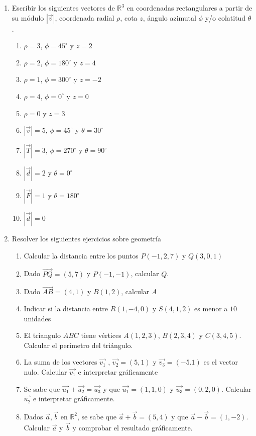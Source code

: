 \documentclass[a4paper]{article}
\newcommand{\exercise}{\item}
\newcommand{\vect}[1]{\overrightarrow{#1}}
\newcommand{\degs}{^{\circ}}
\begin{document}
\begin{enumerate}
\begin{multicols}{2}
\begin{enumerate} [label=(\alph*)]
	\end{enumerate}
	\end{multicols}
	\exercise Escribir los siguientes vectores de $\mathbb{R}^3$ en coordenadas rectangulares a partir de su módulo $|\vec{v}|$, coordenada radial $\rho$, cota $z$, ángulo azimutal $\phi$ y/o colatitud $\theta$.
	\begin{multicols}{2}
	\begin{enumerate} [label=(\alph*)]
		\item $\rho=3$, $\phi=45\degs$ y $z=2$
		\item $\rho=2$, $\phi=180\degs$ y $z=4$
		\item $\rho=1$, $\phi=300\degs$ y $z=-2$
		\item $\rho=4$, $\phi=0\degs$ y $z=0$
		\item $\rho=0$ y $z=3$
		\item $\left|\vec{v}\right|=5$, $\phi=45\degs$ y $\theta=30\degs$
		\item $\left|\vec{T}\right|=3$, $\phi=270\degs$ y $\theta=90\degs$
		\item $\left|\vec{d}\right|=2$ y $\theta=0\degs$
		\item $\left|\vec{F}\right|=1$ y $\theta=180\degs$
		\item $\left|\vec{d}\right|=0$
	\end{enumerate}
	\end{multicols}
	\exercise Resolver los siguientes ejercicios sobre geometría
	\begin{enumerate} [label=(\alph*)]
		\item Calcular la distancia entre los puntos $P(-1,2,7)$ y $Q(3,0,1)$
		\item Dado $\vect{PQ}=(5,7)$ y $P(-1,-1)$, calcular $Q$.
		\item Dado $\vect{AB}=(4,1)$ y $B(1,2)$, calcular $A$
		\item Indicar si la distancia entre $R(1,-4,0)$ y $S(4,1,2)$ es menor a $10$ unidades
		\item El triangulo $ABC$ tiene vértices $A(1,2,3)$, $B(2,3,4)$ y $C(3,4,5)$. Calcular el perímetro del triángulo.
		\item La suma de los vectores $\vect{v_1}$ , $\vect{v_2}=(5,1)$ y $\vect{v_3} = (-5.1)$ es el vector nulo. Calcular $\vect{v_1}$ e interpretar gráficamente
		\item Se sabe que $\vect{u_1} + \vect{u_2} = \vect{u_3}$ y que $\vect{u_1} = (1,1,0)$ y $\vect{u_3}=(0,2,0)$. Calcular $\vect{u_2}$ e interpretar gráficamente.
		\item Dados $\vec{a},\vec{b}$ en $\mathbb{R}^2$, se sabe que $\vec{a}+\vec{b}=(5,4)$ y que $\vec{a}-\vec{b}=(1,-2)$. Calcular $\vec{a}$ y $\vec{b}$ y comprobar el resultado gráficamente.

\end{enumerate}
\end{enumerate}
\end{document}

